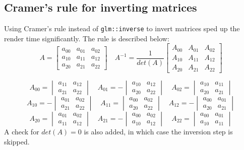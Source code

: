 \documentclass[DIV=calc, paper=a4, fontsize=11pt, twocolumn]{article}	 %
\begin{document}
	\subsection*{Cramer's rule for inverting matrices}
	Using Cramer's rule instead of \texttt{glm::inverse} to invert matrices sped up the render time significantly. The rule is described below:
	\[
		A = 
		\begin{bmatrix} 
		a_{00} & a_{01} & a_{02} \\
		a_{10} & a_{11} & a_{12} \\
		a_{20} & a_{21} & a_{22} 
		\end{bmatrix}
		\quad
		A^{-1} = \dfrac{1}{det(A)}
		\begin{bmatrix} 
		A_{00} & A_{01} & A_{02} \\
		A_{10} & A_{11} & A_{12} \\
		A_{20} & A_{21} & A_{22} 
		\end{bmatrix}
	\]

	\[	
		A_{00} =
		\begin{vmatrix} 
		a_{11} & a_{12} \\
		a_{21} & a_{22} 
		\end{vmatrix}
		\quad
		A_{01} = -
		\begin{vmatrix} 
		a_{10} & a_{12} \\
		a_{20} & a_{22} 
		\end{vmatrix}
		\quad
		A_{02} =
		\begin{vmatrix} 
		a_{10} & a_{11} \\
		a_{20} & a_{21} 
		\end{vmatrix}
		\]\[
		A_{10} = -
		\begin{vmatrix} 
		a_{01} & a_{02} \\
		a_{21} & a_{22} 
		\end{vmatrix}
		\quad
		A_{11} =
		\begin{vmatrix} 
		a_{00} & a_{02} \\
		a_{20} & a_{22} 
		\end{vmatrix}
		\quad
		A_{12} = - 
		\begin{vmatrix} 
		a_{00} & a_{01} \\
		a_{20} & a_{21} 
		\end{vmatrix}
		\]\[
		A_{20} =
		\begin{vmatrix} 
		a_{01} & a_{02} \\
		a_{11} & a_{12} 
		\end{vmatrix}
		\quad
		A_{21} = -
		\begin{vmatrix} 
		a_{00} & a_{02} \\
		a_{10} & a_{12} 
		\end{vmatrix}
		\quad
		A_{22} =
		\begin{vmatrix} 
		a_{00} & a_{01} \\
		a_{10} & a_{11} 
		\end{vmatrix}
	\]
	A check for $det(A) = 0$ is also added, in which case the inversion step is skipped.
	
\end{document}
